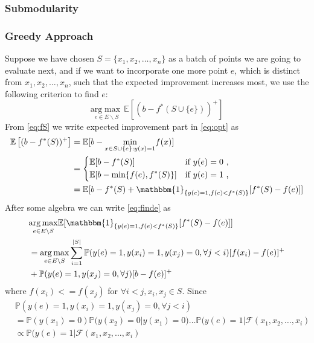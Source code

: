 \documentclass[12pt]{article}
\newcommand{\E}{\mathbb{E}}
\begin{document}
\subsubsection{Submodularity}
\subsubsection{Greedy Approach}
Suppose we have chosen $S=\{x_1, x_2, \ldots, x_n\}$ as a batch of points we are going to evaluate next, and if we want to incorporate one more point $e$, which is distinct from $x_1, x_2, \ldots, x_n$, such that the expected improvement increases most, we use the following criterion to find $e$:
\begin{equation} \label{eq:finde}
\underset{e \in E \backslash S}{\mathrm{arg}\max} \, \E \left[ (b-f^*(S \cup \{e\}))^+ \right] 
\end{equation}
From \eqref{eq:fS} we write expected improvement part in \eqref{eq:opt} as
\begin{align*}
\E \left[ (b-f^*(S))^+ \right] &= \E [b-\underset{x \in S \cup \{e\}:y(x)=1}{\min} f(x)] \\
                  &= 
                  \begin{dcases}
                    \E [b- f^*(S)] & \text{if $y(e)=0$ ,} \\
                    \E [b- \min \{f(e), f^*(S)\}]       & \text{if $y(e)=1$ ,}
                    \end{dcases} \\
                  &= \E [b-f^*(S) + \mathbbm{1}_{\{y(e)=1, f(e) < f^*(S)\}} [f^*(S)-f(e)] ]
\end{align*}
After some algebra we can write \eqref{eq:finde} as
\begin{align*}
&\underset{e \in E \backslash S}{\mathrm{arg}\max} \E [ \mathbbm{1}_{\{y(e)=1, f(e) < f^*(S)\}} [f^*(S)-f(e)] ] \\
&= \underset{e \in E \backslash S}{\mathrm{arg}\max} \sum_{i=1}^{|S|} \mathbb{P} (y(e)=1, y(x_i)=1, y(x_j)=0, \forall j <i) [f(x_i)-f(e)]^+ \\
&+ \mathbb{P} (y(e)=1, y(x_j)=0, \forall j) [b-f(e)]^+
\end{align*}
where $f(x_i)<=f(x_j)$ for $\forall i<j, x_i,x_j \in S$.
Since 
\begin{align*}
&\mathbb{P} (y(e)=1, y(x_i)=1, y(x_j)=0, \forall j <i)\\
&= \mathbb{P}(y(x_1)=0) \mathbb{P}(y(x_2)=0|y(x_1)=0) \ldots \mathbb{P}(y(e)=1|\mathcal{F}(x_1,x_2,\ldots,x_i)\\
&\propto \mathbb{P}(y(e)=1|\mathcal{F}(x_1,x_2,\ldots,x_i)
\end{align*}
\end{document}
